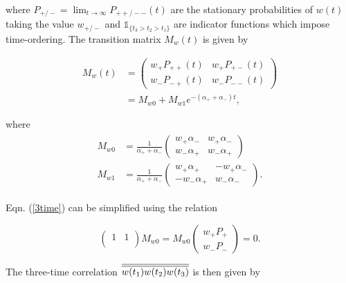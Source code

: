 where $P_{+/-}=\lim_{t \to \infty} P_{++/--}(t)$ are the stationary probabilities of $w(t)$ taking the value $w_{+/-}$ and $\mathds{1}_{\{t_3>t_2>t_1\}}$ are indicator functions which impose time-ordering. The transition matrix $M_w(t)$ is given by 

\begin{align}
    M_{w}(t) &= \begin{pmatrix}
w_+P_{++}(t) & w_+P_{+-}(t) \\
w_-P_{-+}(t)  & w_-P_{--}(t)
\end{pmatrix} \\ 
&= M_{w0} + M_{w1}e^{-(\alpha_+ + \alpha_-)t},
\end{align}

where 
\begin{align}
\begin{split}
M_{w0} &= \frac{1}{\alpha_+ + \alpha_-} \begin{pmatrix}
        w_+\alpha_- & w_+\alpha_- \\
        w_-\alpha_+ & w_-\alpha_+
        \end{pmatrix} \\
        M_{w1} &= \frac{1}{\alpha_+ + \alpha_-} \begin{pmatrix}
        w_+\alpha_+ & -w_+\alpha_- \\
        -w_-\alpha_+ & w_-\alpha_-
        \end{pmatrix}.
\end{split}
\end{align}

Eqn. (\ref{3time}) can be simplified using the relation 

\begin{equation}\label{3time2}
     \begin{pmatrix}
1 & 1\\
\end{pmatrix}M_{w0} = M_{w0}
\begin{pmatrix}
w_+P_{+}\\
w_-P_{-}
\end{pmatrix} = 0.
\end{equation}

The three-time correlation $\overline{\overline{w(t_1)w(t_2)w(t_3)}}$ is then given by 

